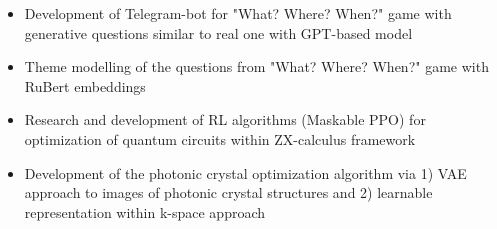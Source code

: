 \begin{itemize}
    \item Development of Telegram-bot for "What? Where? When?" game with generative questions similar to real one with GPT-based model
    \item Theme modelling of the questions from "What? Where? When?" game with RuBert embeddings
\end{itemize}

\begin{itemize}
    \item Research and development of RL algorithms (Maskable PPO) for optimization of quantum circuits within ZX-calculus framework
\end{itemize}

\begin{itemize}
    \item Development of the photonic crystal optimization algorithm via 1) VAE approach to images of photonic crystal structures and 2) learnable representation within k-space approach
\end{itemize}

\cvproject{}